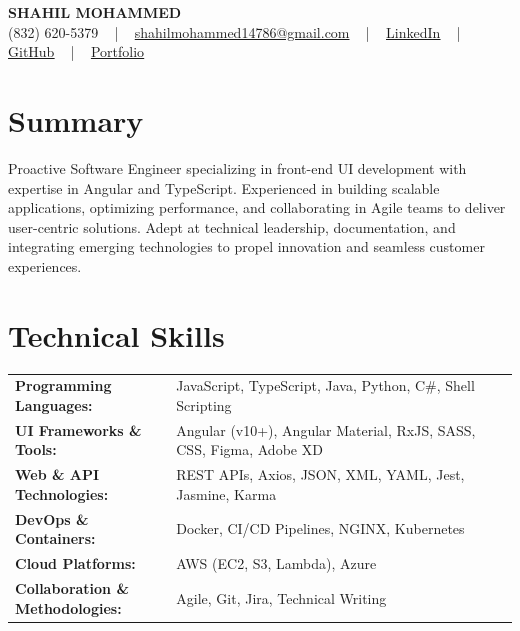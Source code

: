 \documentclass[letterpaper,11pt]{article}
\begin{document}
\begin{center}
    {\fontsize{14pt}{12pt}\selectfont \textbf{\MakeUppercase{Shahil Mohammed}}}\\ \vspace{2pt}
    \fontsize{10pt}{12pt}\selectfont (832) 620-5379 ~ | ~ \href{mailto:shahilmohammed14786@gmail.com}{shahilmohammed14786@gmail.com} ~ | ~  
    \href{https://www.linkedin.com/in/shahil-mohammed-9652931a1/}{\color{blue}\underline{LinkedIn}}  ~ | ~ 
    \href{https://github.com/freakbeast14}{\color{blue}\underline{GitHub}} ~ | ~ 
    \href{https://shahil-mohammed.netlify.app/}{\color{blue}\underline{Portfolio}}
    \vspace{-8pt}
\end{center}

\section{Summary}
\fontsize{9pt}{10pt}\selectfont
Proactive Software Engineer specializing in front-end UI development with expertise in Angular and TypeScript. Experienced in building scalable applications, optimizing performance, and collaborating in Agile teams to deliver user-centric solutions. Adept at technical leadership, documentation, and integrating emerging technologies to propel innovation and seamless customer experiences.
 \vspace{-5pt}
 
\section{Technical Skills}
        \vspace{-14pt}
        \begin{table}[h]
            \fontsize{9pt}{10pt}\selectfont
            \begin{tabular}{p{0.32\linewidth} p{0.68\linewidth}}
                \textbf{Programming Languages:} & JavaScript, TypeScript, Java, Python, C#, Shell Scripting \\
                \textbf{UI Frameworks \& Tools:} & Angular (v10+), Angular Material, RxJS, SASS, CSS, Figma, Adobe XD \\
                \textbf{Web \& API Technologies:} & REST APIs, Axios, JSON, XML, YAML, Jest, Jasmine, Karma \\
                \textbf{DevOps \& Containers:} & Docker, CI/CD Pipelines, NGINX, Kubernetes \\
                \textbf{Cloud Platforms:} & AWS (EC2, S3, Lambda), Azure \\
                \textbf{Collaboration \& Methodologies:} & Agile, Git, Jira, Technical Writing \\
            \end{tabular}
        \end{table}
 \vspace{-15pt}
 
\end{document}
